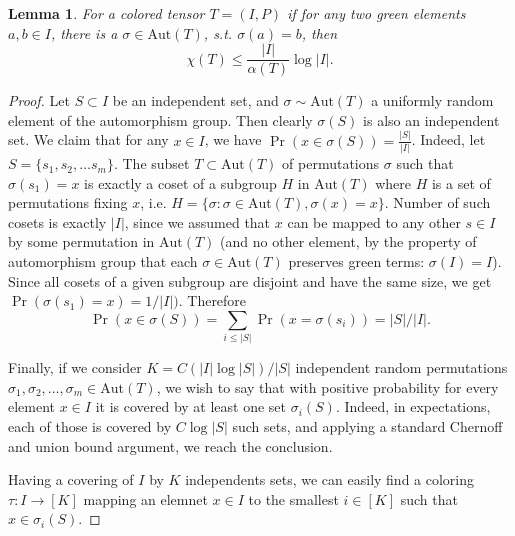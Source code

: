 \documentclass[10pt,a4paper]{article}
\newtheorem{lemma}[theorem]{Lemma}
\newcommand{\Aut}{\mathrm{Aut}}
\newcommand{\jnote}[1]{\todo[inline, color=blue!30!white]{#1 \\ -\textsc{Jarek}}}
\newcommand{\joshnote}[1]{\todo[inline, color=red!30!white]{#1 \\ -\textsc{Josh}}}
\begin{document}
\begin{lemma}
\label{lem:coloring-from-symmetry}
For a colored tensor $T = (I, P)$ if for any two green elements $a,b \in I$, there is a $\sigma \in \Aut(T)$, s.t. $\sigma(a) = b$, then 
\begin{equation*}
    \chi(T) \leq \frac{|I|}{\alpha(T)} \log |I|.
\end{equation*}
\end{lemma}
\begin{proof}
Let $S \subset I$ be an independent set, and $\sigma \sim \Aut(T)$ a uniformly random element of the automorphism group. Then clearly $\sigma(S)$ is also an independent set. We claim that for any $x \in I$, we have $\Pr(x \in \sigma(S)) = \frac{|S|}{|I|}$. Indeed, let $S = \{ s_1, s_2, \ldots s_m \}$. The subset $T \subset \Aut(T)$ of permutations $\sigma$ such that $\sigma(s_1) = x$ is exactly a coset of a subgroup $H$ in $\Aut(T)$ where $H$ is a set of permutations fixing $x$, i.e. $H = \{ \sigma : \sigma \in \Aut(T), \sigma(x) = x \}$. Number of such cosets is exactly $|I|$, since we assumed that $x$ can be mapped to any other $s \in I$ by some permutation in $\Aut(T)$ (and no other element, by the property of automorphism group that each $\sigma \in \Aut(T)$ preserves green terms: $\sigma(I) = I$). Since all cosets of a given subgroup are disjoint and have the same size, we get $\Pr(\sigma(s_1) = x) = 1/|I|)$. Therefore
\begin{equation*}
    \Pr(x \in \sigma(S)) = \sum_{i \leq |S|} \Pr(x = \sigma(s_i)) = |S|/|I|.
\end{equation*}

Finally, if we consider $K = C (|I| \log |S|) / |S|$ independent random permutations $\sigma_1, \sigma_2, \ldots, \sigma_m \in \Aut(T)$, we wish to say that with positive probability for every element $x \in I$ it is covered by at least one set $\sigma_i(S)$. Indeed, in expectations, each of those is covered by $C \log |S|$ such sets, and applying a standard Chernoff and union bound argument, we reach the conclusion. 

Having a covering of $I$ by $K$ independents sets, we can easily find a coloring $\tau : I \to [K]$ mapping an elemnet $x \in I$ to the smallest $i \in [K]$ such that $x \in \sigma_i(S)$.
\end{proof}
\end{document}
